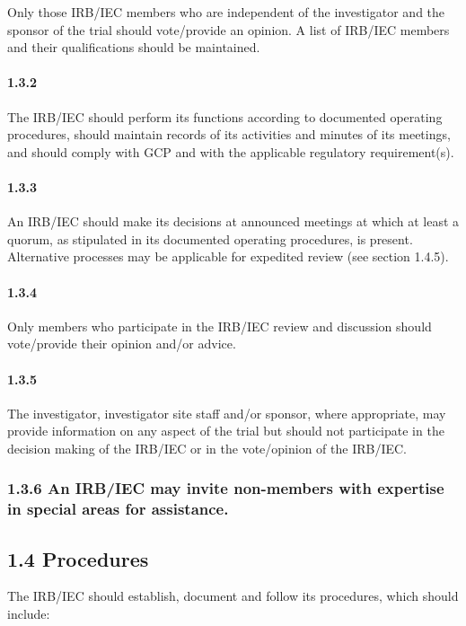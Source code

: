 \documentclass[11pt]{article}
\begin{document}
Only those IRB/IEC members who are independent of the investigator and the sponsor of the trial should vote/provide an opinion. A list of IRB/IEC members and their qualifications should be maintained.


\paragraph{1.3.2} The IRB/IEC should perform its functions according to documented operating procedures, should maintain records of its activities and minutes of its meetings, and should comply with GCP and with the applicable regulatory requirement(s).

\paragraph{1.3.3} An IRB/IEC should make its decisions at announced meetings at which at least a quorum, as stipulated in its documented operating procedures, is present. Alternative processes may be applicable for expedited review (see section 1.4.5).

\paragraph{1.3.4} Only members who participate in the IRB/IEC review and discussion should vote/provide their opinion and/or advice.

\paragraph{1.3.5} The investigator, investigator site staff and/or sponsor, where appropriate, may provide information on any aspect of the trial but should not participate in the decision making of the IRB/IEC or in the vote/opinion of the IRB/IEC.

\subsubsection{1.3.6 An IRB/IEC may invite non-members with expertise in special areas for assistance.}

\subsection{1.4 Procedures}

The IRB/IEC should establish, document and follow its procedures, which should include:
\end{document}

